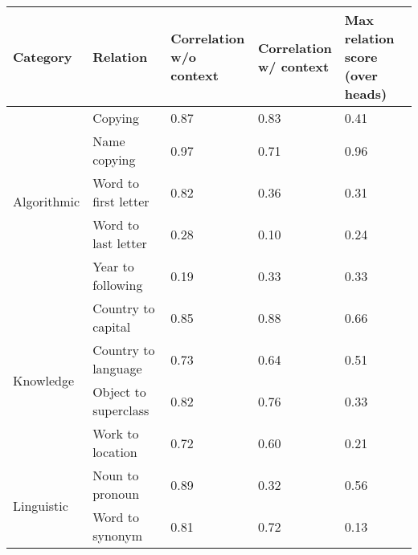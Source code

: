 \begin{tabular}{lllll}
\toprule
Category & Relation & \makecell{Correlation\\w/o context} & \makecell{Correlation\\w/ context} & \makecell{Max relation score\\(over heads)} \\
\midrule
\multirow{5}{*}{Algorithmic} & Copying & 0.87 & 0.83 & 0.41 \\
 & Name copying & 0.97 & 0.71 & 0.96 \\
 & Word to first letter & 0.82 & 0.36 & 0.31 \\
 & Word to last letter & 0.28 & 0.10 & 0.24 \\
 & Year to following & 0.19 & 0.33 & 0.33 \\
\multirow{4}{*}{Knowledge} & Country to capital & 0.85 & 0.88 & 0.66 \\
 & Country to language & 0.73 & 0.64 & 0.51 \\
 & Object to superclass & 0.82 & 0.76 & 0.33 \\
 & Work to location & 0.72 & 0.60 & 0.21 \\
\multirow{2}{*}{Linguistic} & Noun to pronoun & 0.89 & 0.32 & 0.56 \\
 & Word to synonym & 0.81 & 0.72 & 0.13 \\
\bottomrule
\end{tabular}
